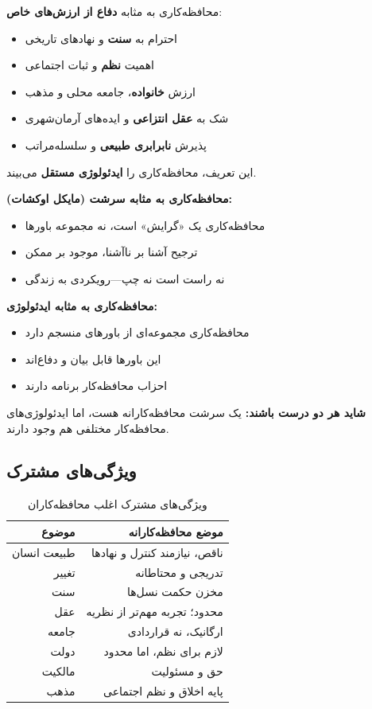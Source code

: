 \begin{defbox}
محافظه‌کاری به مثابه \textbf{دفاع از ارزش‌های خاص}:
\begin{itemize}[nosep]
    \item احترام به \textbf{سنت} و نهادهای تاریخی
    \item اهمیت \textbf{نظم} و ثبات اجتماعی
    \item ارزش \textbf{خانواده}، جامعه محلی و مذهب
    \item شک به \textbf{عقل انتزاعی} و ایده‌های آرمان‌شهری
    \item پذیرش \textbf{نابرابری طبیعی} و سلسله‌مراتب
\end{itemize}
این تعریف، محافظه‌کاری را \textbf{ایدئولوژی مستقل} می‌بیند.
\end{defbox}

\begin{debatebox}
\textbf{محافظه‌کاری به مثابه سرشت (مایکل اوکشات):}
\begin{itemize}[nosep]
    \item محافظه‌کاری یک «گرایش» است، نه مجموعه باورها
    \item ترجیح آشنا بر ناآشنا، موجود بر ممکن
    \item نه راست است نه چپ—رویکردی به زندگی
\end{itemize}

\textbf{محافظه‌کاری به مثابه ایدئولوژی:}
\begin{itemize}[nosep]
    \item محافظه‌کاری مجموعه‌ای از باورهای منسجم دارد
    \item این باورها قابل بیان و دفاع‌اند
    \item احزاب محافظه‌کار برنامه دارند
\end{itemize}

\textbf{شاید هر دو درست باشند:} یک سرشت محافظه‌کارانه هست، اما ایدئولوژی‌های محافظه‌کار مختلفی هم وجود دارند.
\end{debatebox}

\subsection{ویژگی‌های مشترک}

\begin{table}[htbp]
\centering
\caption{ویژگی‌های مشترک اغلب محافظه‌کاران}
\label{tab:conservatism-features}
\begin{tabular}{r|r}
\toprule
\textbf{موضوع} & \textbf{موضع محافظه‌کارانه} \\
\midrule
طبیعت انسان & ناقص، نیازمند کنترل و نهادها \\
تغییر & تدریجی و محتاطانه \\
سنت & مخزن حکمت نسل‌ها \\
عقل & محدود؛ تجربه مهم‌تر از نظریه \\
جامعه & ارگانیک، نه قراردادی \\
دولت & لازم برای نظم، اما محدود \\
مالکیت & حق و مسئولیت \\
مذهب & پایه اخلاق و نظم اجتماعی \\
\bottomrule
\end{tabular}
\end{table}

